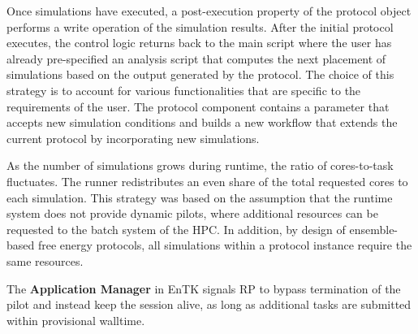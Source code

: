Once simulations have executed, a post-execution property of the protocol object
performs a write operation of the simulation results. After the initial protocol 
executes, the control logic returns back to the main script where the user has 
already pre-specified an analysis script that computes the next placement of 
simulations based on the output generated by the protocol. The choice of this 
strategy is to account for various functionalities that are specific to the 
requirements of the user. The protocol component contains a parameter that 
accepts new simulation conditions and builds a new workflow that extends the 
current protocol by incorporating new simulations.

As the number of simulations grows during runtime, the ratio of cores-to-task 
fluctuates. The runner redistributes an even share of the total requested cores 
to each simulation. This strategy was based on the assumption that the runtime 
system does not provide dynamic pilots, where additional resources can be 
requested to the batch system of the HPC. In addition, by design of 
ensemble-based free energy protocols, all simulations within a protocol instance
require the same resources. 

The \textbf{Application Manager} in EnTK signals RP to 
bypass termination of the pilot and instead keep the session alive, as long as 
additional tasks are submitted within provisional walltime. 










